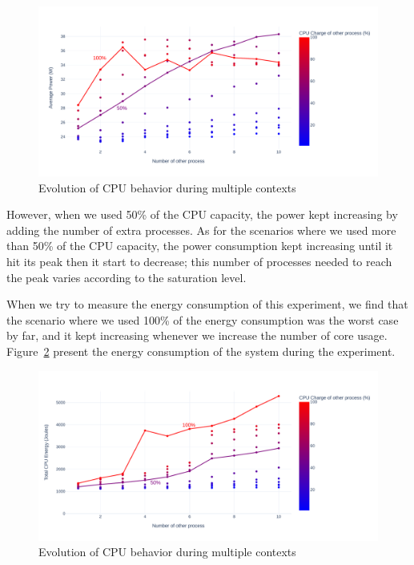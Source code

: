 \begin{figure}[!h]
      \centering
      \includegraphics[width=\linewidth]{chapters/green_faas_power}
      \caption{Evolution of CPU behavior during multiple contexts }
      \label{fig:green_faas_power}
\end{figure}


However, when we used 50\% of the CPU capacity, the power kept increasing by adding the number of extra processes.
As for the scenarios where we used more than 50\% of the CPU capacity, the power consumption kept increasing until it hit its peak then it start to decrease; this number of processes needed to reach the peak varies according to the saturation level.

When we try to measure the energy consumption of this experiment, we find that the scenario where we used 100\% of the energy consumption was the worst case by far, and it kept increasing whenever we increase the number of core usage.
Figure~\ref{fig:green_faas_energy} present the energy consumption of the system during the experiment.

\begin{figure}[!h]
      \centering
      \caption{Evolution of CPU behavior during multiple contexts }
      \label{fig:green_faas_energy}
      \includegraphics[width=\linewidth]{chapters/green_faas_energy}
\end{figure}

